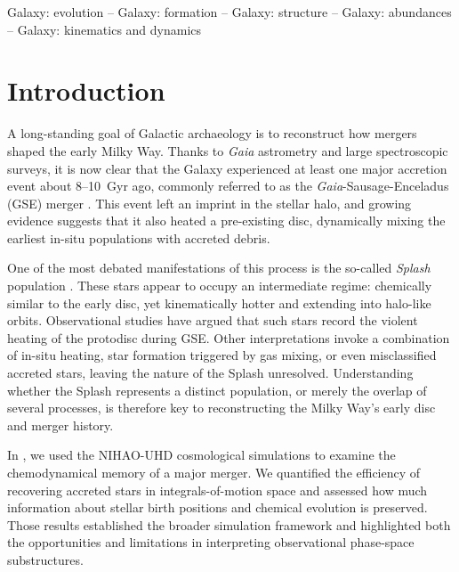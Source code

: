\documentclass[fleqn,usenatbib]{mnras}
\begin{document}
\begin{keywords}
Galaxy: evolution -- Galaxy: formation -- Galaxy: structure -- Galaxy: abundances -- Galaxy: kinematics and dynamics
\end{keywords}


\section{Introduction}
\label{sec:introduction}

A long-standing goal of Galactic archaeology is to reconstruct how mergers shaped the early Milky Way. 
Thanks to \textit{Gaia} astrometry \citep{Brown2021b} and large spectroscopic surveys, it is now clear that the Galaxy experienced at least one major accretion event about 8--10~Gyr ago, commonly referred to as the \textit{Gaia}-Sausage-Enceladus (GSE) merger \citep{Belokurov2018, Helmi2018, Naidu2020}. 
This event left an imprint in the stellar halo, and growing evidence suggests that it also heated a pre-existing disc, dynamically mixing the earliest in-situ populations with accreted debris.

One of the most debated manifestations of this process is the so-called \textit{Splash} population \citep{Belokurov2020, Belokurov2022}. These stars appear to occupy an intermediate regime: chemically similar to the early disc, yet kinematically hotter and extending into halo-like orbits. Observational studies have argued that such stars record the violent heating of the protodisc during GSE. Other interpretations invoke a combination of in-situ heating, star formation triggered by gas mixing, or even misclassified accreted stars, leaving the nature of the Splash unresolved. Understanding whether the Splash represents a distinct population, or merely the overlap of several processes, is therefore key to reconstructing the Milky Way’s early disc and merger history.

In \citet[][hereafter ]{Buder2025c}, we used the NIHAO-UHD cosmological simulations \citep{Buck2020, Buck2021} to examine the chemodynamical memory of a major merger. We quantified the efficiency of recovering accreted stars in integrals-of-motion space and assessed how much information about stellar birth positions and chemical evolution is preserved. Those results established the broader simulation framework and highlighted both the opportunities and limitations in interpreting observational phase-space substructures.
\end{document}
